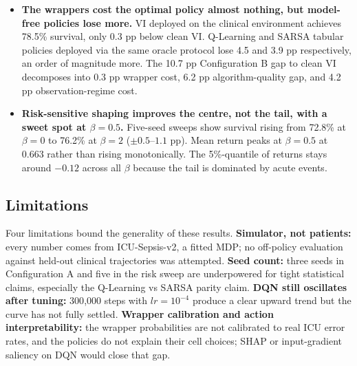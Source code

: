 \begin{itemize}
    \item \textbf{The wrappers cost the optimal policy almost nothing, but model-free policies lose more.} VI deployed on the clinical environment achieves 78.5\% survival, only 0.3 pp below clean VI. Q-Learning and SARSA tabular policies deployed via the same oracle protocol lose 4.5 and 3.9 pp respectively, an order of magnitude more. The 10.7 pp Configuration B gap to clean VI decomposes into 0.3 pp wrapper cost, 6.2 pp algorithm-quality gap, and 4.2 pp observation-regime cost.
    \item \textbf{Risk-sensitive shaping improves the centre, not the tail, with a sweet spot at $\beta = 0.5$.} Five-seed sweeps show survival rising from 72.8\% at $\beta = 0$ to 76.2\% at $\beta = 2$ ($\pm 0.5$--$1.1$ pp). Mean return peaks at $\beta = 0.5$ at 0.663 rather than rising monotonically. The 5\%-quantile of returns stays around $-0.12$ across all $\beta$ because the tail is dominated by acute events.
\end{itemize}

\subsection{Limitations}

Four limitations bound the generality of these results. \textbf{Simulator, not patients:} every number comes from ICU-Sepsis-v2, a fitted MDP; no off-policy evaluation against held-out clinical trajectories was attempted. \textbf{Seed count:} three seeds in Configuration A and five in the risk sweep are underpowered for tight statistical claims, especially the Q-Learning vs SARSA parity claim. \textbf{DQN still oscillates after tuning:} 300{,}000 steps with $lr = 10^{-4}$ produce a clear upward trend but the curve has not fully settled. \textbf{Wrapper calibration and action interpretability:} the wrapper probabilities are not calibrated to real ICU error rates, and the policies do not explain their cell choices; SHAP or input-gradient saliency on DQN would close that gap.

